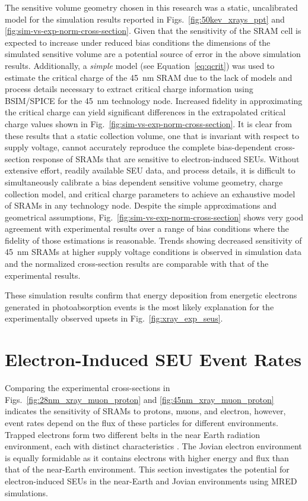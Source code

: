 The sensitive volume geometry chosen in this research was a static, uncalibrated model for the simulation results reported in Figs.~\ref{fig:50kev_xrays_ppt} and \ref{fig:sim-vs-exp-norm-cross-section}.
Given that the sensitivity of the SRAM cell is expected to increase under reduced bias conditions the dimensions of the simulated sensitive volume are a potential source of error in the above simulation results.
Additionally, a \emph{simple} model (see Equation~\ref{eq:qcrit}) was used to estimate the critical charge of the 45~nm SRAM due to the lack of models and process details necessary to extract critical charge information using BSIM/SPICE for the 45~nm technology node.
Increased fidelity in approximating the critical charge can yield significant differences in the extrapolated critical charge values shown in Fig.~\ref{fig:sim-vs-exp-norm-cross-section}.
It is clear from these results that a static collection volume, one that is invariant with respect to supply voltage, cannot accurately reproduce the complete bias-dependent cross-section response of SRAMs that are sensitive to electron-induced SEUs.
Without extensive effort, readily available SEU data, and process details, it is difficult to simultaneously calibrate a bias dependent sensitive volume geometry, charge collection model, and critical charge parameters to achieve an exhaustive model of SRAMs in any technology node.
Despite the simple approximations and geometrical assumptions, Fig.~\ref{fig:sim-vs-exp-norm-cross-section} shows very good agreement with experimental results over a range of bias conditions where the fidelity of those estimations is reasonable.
Trends showing decreased sensitivity of 45~nm SRAMs at higher supply voltage conditions is observed in simulation data and the normalized cross-section results are comparable with that of the experimental results.

These simulation results confirm that energy deposition from energetic electrons generated in photoabsorption events is the most likely explanation for the experimentally observed upsets in Fig.~\ref{fig:xray_exp_seus}. %

\section{Electron-Induced SEU Event Rates} %
\label{sec:electron_induced_seu_event_rates}
Comparing the experimental cross-sections in Figs.~\ref{fig:28nm_xray_muon_proton} and \ref{fig:45nm_xray_muon_proton} indicates the sensitivity of SRAMs to protons, muons, and electron, however, event rates depend on the flux of these particles for different environments. 
Trapped electrons form two different belts in the near Earth radiation environment, each with distinct characteristics \cite{Bourdarie:kj, Xapsos:2013cu}.
The Jovian electron environment is equally formidable as it contains electrons with higher energy and flux than that of the near-Earth environment.
This section investigates the potential for electron-induced SEUs in the near-Earth and Jovian environments using MRED simulations.

